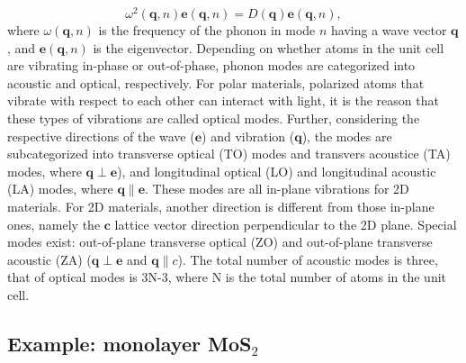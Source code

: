 \begin{equation}\label{eqa:w_q}
\omega^2(\mathbf{q},n)\mathbf{e}(\mathbf{q},n)=D(\mathbf{q})\mathbf{e}(\mathbf{q},n),
\end{equation}
where $\omega(\mathbf{q},n)$ is the frequency of the phonon in mode $n$ having a wave vector $\mathbf{q}$, and $\mathbf{e}(\mathbf{q},n)$ is the eigenvector\cite{Ackland1997,Parlinski2011}.  Depending on whether atoms in the unit cell are vibrating in-phase or out-of-phase, phonon modes are categorized into acoustic and optical, respectively. For polar materials, polarized atoms that vibrate with respect to each other can interact with light, it is the reason that these types of vibrations are called optical modes. Further, considering the respective directions of the wave ($\mathbf{e}$) and vibration ($\mathbf{q}$), the modes are subcategorized into transverse optical (TO) modes and transvers acoustice (TA) modes, where $\mathbf{q} \perp \mathbf{e}$), and longitudinal optical (LO) and longitudinal acoustic (LA) modes, where $\mathbf{q} \parallel \mathbf{e}$. These modes are all in-plane vibrations for 2D materials. For 2D materials, another direction is different from those in-plane ones, namely the $\mathbf{c}$ lattice vector direction perpendicular to the 2D plane. Special modes exist: out-of-plane transverse optical (ZO) and out-of-plane transverse acoustic (ZA) ($\mathbf{q} \perp \mathbf{e}$ and $\mathbf{q} \parallel c$). The total number of acoustic modes is three, that of optical modes is 3N-3, where N is the total number of atoms in the unit cell. 


\subsection{Example: monolayer MoS$_2$}

